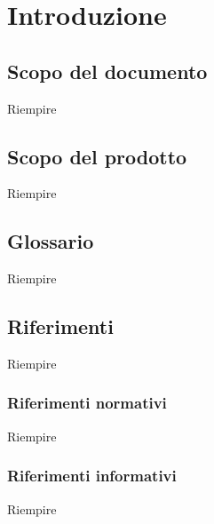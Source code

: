 \section{Introduzione} \label{introduzione}
    \subsection{Scopo del documento}
    Riempire

    \subsection{Scopo del prodotto}
    Riempire

    \subsection{Glossario}
    Riempire

    \subsection{Riferimenti}
    Riempire

        \subsubsection{Riferimenti normativi}
        Riempire

        \subsubsection{Riferimenti informativi}
        Riempire
